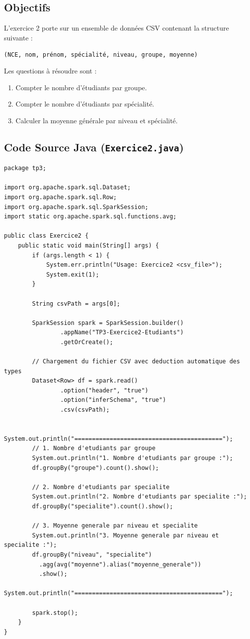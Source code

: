\documentclass[11pt,a4paper]{article}
\begin{document}
\subsection{Objectifs}
L'exercice 2 porte sur un ensemble de données CSV contenant la structure suivante :
\begin{center}
\texttt{(NCE, nom, prénom, spécialité, niveau, groupe, moyenne)}
\end{center}
Les questions à résoudre sont :
\begin{enumerate}
    \item Compter le nombre d'étudiants par groupe.
    \item Compter le nombre d'étudiants par spécialité.
    \item Calculer la moyenne générale par niveau et spécialité.
\end{enumerate}

\subsection{Code Source Java (\texttt{Exercice2.java})}
\begin{lstlisting}[style=customjava]
package tp3;

import org.apache.spark.sql.Dataset;
import org.apache.spark.sql.Row;
import org.apache.spark.sql.SparkSession;
import static org.apache.spark.sql.functions.avg;

public class Exercice2 {
    public static void main(String[] args) {
        if (args.length < 1) {
            System.err.println("Usage: Exercice2 <csv_file>");
            System.exit(1);
        }

        String csvPath = args[0];

        SparkSession spark = SparkSession.builder()
                .appName("TP3-Exercice2-Etudiants")
                .getOrCreate();

        // Chargement du fichier CSV avec deduction automatique des types
        Dataset<Row> df = spark.read()
                .option("header", "true")
                .option("inferSchema", "true")
                .csv(csvPath);

        System.out.println("==========================================");
        // 1. Nombre d'etudiants par groupe
        System.out.println("1. Nombre d'etudiants par groupe :");
        df.groupBy("groupe").count().show();

        // 2. Nombre d'etudiants par specialite
        System.out.println("2. Nombre d'etudiants par specialite :");
        df.groupBy("specialite").count().show();

        // 3. Moyenne generale par niveau et specialite
        System.out.println("3. Moyenne generale par niveau et specialite :");
        df.groupBy("niveau", "specialite")
          .agg(avg("moyenne").alias("moyenne_generale"))
          .show();
        System.out.println("==========================================");

        spark.stop();
    }
}
\end{lstlisting}
\end{document}
